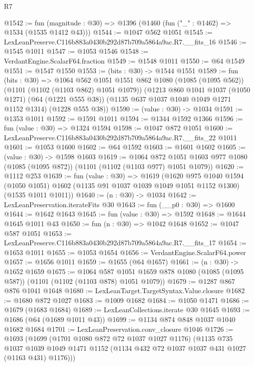 \begin{lexlean}{R7}
\begin{coremodule}
@1542 := fun (magnitude : @30) => @1396 (@1460 (fun ("_" : @1462) => @1534 (@1535 @1412 @43)))
@1544 := @1047 @562 @1051
@1545 := LexLeanPreserve.C116b883a0430b292d87b709a5864a9ac.R7.__fits_16
@1546 := @1545 @1011
@1547 := @1053 @1546
@1548 := VerdantEngine.ScalarF64.fraction
@1549 := @1548 @1011
@1550 := @64 @1549
@1551 := @1547 @1550
@1553 := (bits : @30) -> @1544 @1551
@1589 := fun (bits : @30) =>
  @1064
    @562
    @1051
    @1551
    @862
    @1080
    (@1085 (@1095 @562))
    (@1101 (@1102 (@1103 @862) @1051 @1079))
    (@1213
      @860
      @1041
      @1037
      (@1050 @1271)
      (@64 (@1221 @555 @38))
      (@1135 @637 @1037 @1040 @1049 @1271 @1152 @1314)
      (@1228 @555 @38))
@1590 := (value : @30) -> @1034
@1591 := @1353 @1011
@1592 := @1591 @1011
@1594 := @1344 @1592 @1366
@1596 := fun (value : @30) => @1324 @1594
@1598 := @1047 @872 @1051
@1600 := LexLeanPreserve.C116b883a0430b292d87b709a5864a9ac.R7.__fits_22 @1011
@1601 := @1053 @1600
@1602 := @64 @1592
@1603 := @1601 @1602
@1605 := (value : @30) -> @1598 @1603
@1619 := @1064
    @872
    @1051
    @1603
    @977
    @1080
    (@1085 (@1095 @872))
    (@1101 (@1102 (@1103 @977) @1051 @1079))
@1620 := @1112 @253
@1639 := fun (value : @30) =>
  @1619
    (@1620
      @975
      @1040
      @1594
      (@1050 @1051)
      @1602
      (@1135 @91 @1037 @1039 @1049 @1051 @1152 @1300)
      (@1535 @1011 @1011))
@1640 := (n : @30) -> @1034
@1642 := LexLeanPreservation.iterateFits @30
@1643 := fun (__p0 : @30) => @1600
@1644 := @1642 @1643
@1645 := fun (value : @30) => @1592
@1648 := @1644 @1645 @1011 @43
@1650 := fun (n : @30) => @1042 @1648
@1652 := @1047 @587 @1051
@1653 := LexLeanPreserve.C116b883a0430b292d87b709a5864a9ac.R7.__fits_17
@1654 := @1653 @1011
@1655 := @1053 @1654
@1656 := VerdantEngine.ScalarF64.power
@1657 := @1656 @1011
@1659 := @1655 (@64 @1657)
@1661 := (n : @30) -> @1652 @1659
@1675 := @1064
    @587
    @1051
    @1659
    @878
    @1080
    (@1085 (@1095 @587))
    (@1101 (@1102 (@1103 @878) @1051 @1079))
@1679 := @1287 @867 @876 @1041 @1648
@1680 := LexLeanTarget.TargetSyntax.Value.closure
@1682 := @1680 @872 @1027
@1683 := @1009 @1682
@1684 := @1050 @1471
@1686 := @1679 (@1683 @1684)
@1689 := LexLeanCollections.iterate @30 @1645
@1693 := @1686 (@64 (@1689 @1011 @43))
@1699 := @1134 @874 @848 @1037 @1040 @1682 @1684
@1701 := LexLeanPreservation.conv_closure @1046
@1726 := @1693
    (@1699
      (@1701 @1080 @872 @72 @1037 @1027 @1176)
      (@1135
        @735
        @1037
        @1039
        @1049
        @1471
        @1152
        (@1134 @432 @72 @1037 @1037 @431 @1027 (@1163 @431) @1176)))

\end{coremodule}
\end{lexlean}
